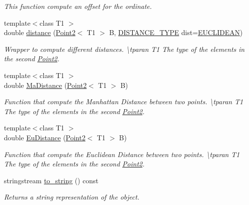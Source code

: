 \begin{DoxyCompactItemize}
\begin{DoxyCompactList}\small\item\em This function compute an offset for the ordinate. \end{DoxyCompactList}\item 
{\footnotesize template$<$class T1 $>$ }\\double \mbox{\hyperlink{class_point2_a5f50f8f110af78415a56b0c32c2c8b8f}{distance}} (\mbox{\hyperlink{class_point2}{Point2}}$<$ T1 $>$ B, \mbox{\hyperlink{maths_8hh_ac50d7263b1cae8691420b86282b27f90}{D\+I\+S\+T\+A\+N\+C\+E\+\_\+\+T\+Y\+PE}} dist=\mbox{\hyperlink{maths_8hh_ac50d7263b1cae8691420b86282b27f90a81bbbc4428c3ff3f1327e94957e2b5f1}{E\+U\+C\+L\+I\+D\+E\+AN}})
\begin{DoxyCompactList}\small\item\em Wrapper to compute different distances. \textbackslash{}tparan T1 The type of the elements in the second {\ttfamily \mbox{\hyperlink{class_point2}{Point2}}}. \end{DoxyCompactList}\item 
{\footnotesize template$<$class T1 $>$ }\\double \mbox{\hyperlink{class_point2_a10a4aa3d7939b1675f4bd18b8f9f0ead}{Ma\+Distance}} (\mbox{\hyperlink{class_point2}{Point2}}$<$ T1 $>$ B)
\begin{DoxyCompactList}\small\item\em Function that compute the Manhattan Distance between two points. \textbackslash{}tparan T1 The type of the elements in the second {\ttfamily \mbox{\hyperlink{class_point2}{Point2}}}. \end{DoxyCompactList}\item 
{\footnotesize template$<$class T1 $>$ }\\double \mbox{\hyperlink{class_point2_aa930b619ed2efeda96b4210ee3b8cb9c}{Eu\+Distance}} (\mbox{\hyperlink{class_point2}{Point2}}$<$ T1 $>$ B)
\begin{DoxyCompactList}\small\item\em Function that compute the Euclidean Distance between two points. \textbackslash{}tparan T1 The type of the elements in the second {\ttfamily \mbox{\hyperlink{class_point2}{Point2}}}. \end{DoxyCompactList}\item 
stringstream \mbox{\hyperlink{class_point2_aa04082290a2f554060081beafd7d7e0d}{to\+\_\+string}} () const
\begin{DoxyCompactList}\small\item\em Returns a string representation of the object. \end{DoxyCompactList}\item 

\end{DoxyCompactItemize}
